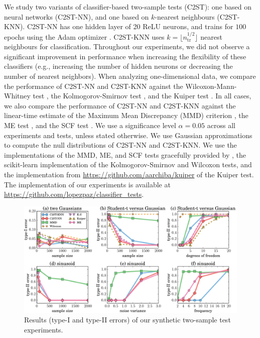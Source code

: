 \documentclass[a4paper]{article}
\begin{document}
  We study two variants of classifier-based two-sample tests
  (C2ST): one based on neural networks (C2ST-NN), and one based
  on $k$-nearest neighbours (C2ST-KNN).  C2ST-NN has one
  hidden layer of 20 ReLU neurons, and trains for $100$ epochs using the Adam
  optimizer \citep{adam}. C2ST-KNN
  uses $k = \lfloor n_{\text{tr}}^{1/2}\rfloor$ nearest neighbours for
  classification.
  Throughout our experiments, we did not observe a significant improvement in
  performance when increasing the flexibility of these classifiers (e.g.,
  increasing the number of hidden neurons or decreasing the number of nearest
  neighbors).
  When analyzing one-dimensional data, we compare the performance of C2ST-NN
  and C2ST-KNN against the Wilcoxon-Mann-Whitney test
  \citep{wilcoxon1945individual,mann1947test}, the Kolmogorov-Smirnov test
  \citep{kolmogorov1933sulla,smirnov1939estimation}, and the Kuiper test
  \citep{kuiper}. In all cases, we also compare the performance of C2ST-NN and
  C2ST-KNN against the linear-time estimate of the Maximum Mean Discrepancy
  (MMD) criterion \citep{gretton2012kernel}, the ME test \citep{metests}, and
  the SCF test \citep{metests}.  We use a significance level $\alpha =0.05$
  across all experiments and tests, unless stated otherwise. We use Gaussian
  approximations to compute the null distributions of C2ST-NN and C2ST-KNN.  We
  use the implementations of the MMD, ME, and SCF tests gracefully provided by
  \citet{metests}, the scikit-learn implementation of the Kolmogorov-Smirnov
  and Wilcoxon tests, and the implementation from
  {\small\url{https://github.com/aarchiba/kuiper}} of the Kuiper test. The
  implementation of our experiments is available at
  {\small\url{https://github.com/lopezpaz/classifier_tests}}.

  \begin{figure}
    \begin{center}
      \includegraphics[width=\textwidth]{figures/synthetic_results.pdf}
    \end{center}
    \vspace{-0.2cm}
    \caption{Results (type-I and type-II errors) of our synthetic two-sample test experiments.}
    \vspace{-0.2cm}
    \label{fig:synthetic}
  \end{figure}
\end{document}
